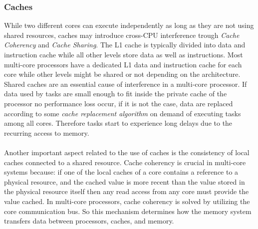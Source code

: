 \subsubsection{Caches}
While two different cores can execute independently as long as they are not using shared resources, caches may introduce cross-CPU interference trough \emph{Cache Coherency} and \emph{Cache Sharing}. The L1 cache is typically divided into data and instruction cache while all other levels store data as well as instructions. Most multi-core processors have a dedicated L1 data and instruction cache for each core while other levels might be shared or not depending on the architecture. Shared caches are an essential cause of interference in a multi-core processor. If data used by tasks are small enough to fit inside the private cache of the processor no performance loss occur, if it is not the case, data are replaced according to some \emph{cache replacement algorithm} on demand of executing tasks among all cores. Therefore tasks start to experience long delays due to the recurring access to memory.

\paragraph{} Another important aspect related to the use of caches is the consistency of local caches connected to a shared resource. Cache coherency is crucial in multi-core systems because: if one of the local caches of a core contains a reference to a physical resource, and the cached value is more recent than the value stored in the physical resource itself then any read access from any core must provide the value cached. In multi-core processors, cache coherency is solved by utilizing the core communication bus. So this mechanism determines how the memory system transfers data between processors, caches, and memory.

